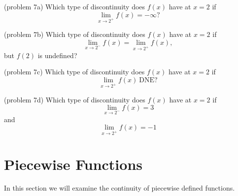 \documentclass{ximera}
\begin{document}

\begin{problem}(problem 7a)
Which type of discontinuity does $f(x)$ have at $x=2$ if
\[
\lim_{x \to 2^+} f(x) = -\infty?
\]

\begin{multipleChoice}
\end{multipleChoice}
\end{problem}

\begin{problem}(problem 7b)
Which type of discontinuity does $f(x)$ have at $x=2$ if
\[
\lim_{x \to 2^-} f(x) = \lim_{x \to 2^+} f(x),
\]
but $f(2)$ is undefined?
\begin{multipleChoice}
\end{multipleChoice}
\end{problem}

\begin{problem}(problem 7c)
Which type of discontinuity does $f(x)$ have at $x=2$ if
\[
\lim_{x \to 2^+} f(x) \ \text{DNE}?
\]

\begin{multipleChoice}
\end{multipleChoice}
\end{problem}

\begin{problem}(problem 7d)
Which type of discontinuity does $f(x)$ have at $x=2$ if
\[
\lim_{x \to 2^-} f(x) = 3
\]
and
\[
\lim_{x \to 2^+} f(x) = -1
\]
\begin{multipleChoice}
\end{multipleChoice}
\end{problem}



\section{Piecewise Functions}


In this section we will examine the continuity of piecewise defined functions.
\end{document}
